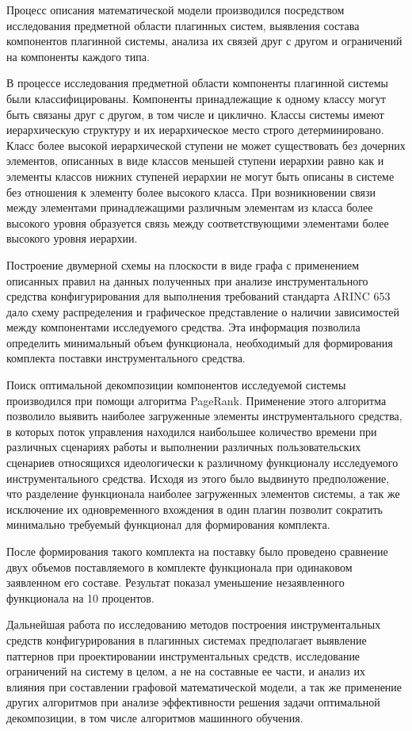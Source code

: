 \documentclass[14pt, a4paper]{article}
\begin{document}
Процесс описания математической модели производился посредством исследования предметной области плагинных систем, выявления состава компонентов плагинной системы, анализа их связей друг с другом и ограничений на компоненты каждого типа.

В процессе исследования предметной области компоненты плагинной системы были классифицированы. Компоненты принадлежащие к одному классу могут быть связаны друг с другом, в том числе и циклично. Классы системы имеют иерархическую структуру и их иерархическое место строго детерминировано. Класс более высокой иерархической ступени не может существовать без дочерних элементов, описанных в виде классов меньшей ступени иерархии равно как и элементы классов нижних ступеней иерархии не могут быть описаны в системе без отношения к элементу более высокого класса. При возникновении связи между элементами принадлежащими различным элементам из класса более высокого уровня образуется связь между соответствующими элементами более высокого уровня иерархии.

Построение двумерной схемы на плоскости в виде графа с применением описанных правил на данных полученных при анализе инструментального средства конфигурирования для выполнения требований стандарта ARINC 653 дало схему распределения и графическое представление о наличии зависимостей между компонентами исследуемого средства. Эта информация позволила определить минимальный объем функционала, необходимый для формирования комплекта поставки инструментального средства.

Поиск оптимальной декомпозиции компонентов исследуемой системы производился при помощи алгоритма PageRank. Применение этого алгоритма позволило выявить наиболее загруженные элементы инструментального средства, в которых поток управления находился наибольшее количество времени при различных сценариях работы и выполнении различных пользовательских сценариев относящихся идеологически к различному функционалу исследуемого инструментального средства. Исходя из этого было выдвинуто предположение, что разделение функционала наиболее загруженных элементов системы, а так же исключение их одновременного вхождения в один плагин позволит сократить минимально требуемый функционал для формирования комплекта.

После формирования такого комплекта на поставку было проведено сравнение двух объемов поставляемого в комплекте функционала при одинаковом заявленном его составе. Результат показал уменьшение незаявленного функционала на 10 процентов.

Дальнейшая работа по исследованию методов построения инструментальных средств конфигурирования в плагинных системах предполагает выявление паттернов при проектировании инструментальных средств, исследование ограничений на систему в целом, а не на составные ее части, и анализ их влияния при составлении графовой математической модели, а так же применение других алгоритмов при анализе эффективности решения задачи оптимальной декомпозиции, в том числе алгоритмов машинного обучения.
\end{document}
